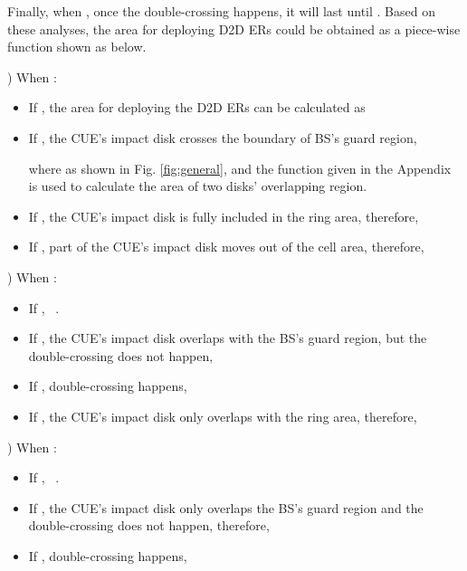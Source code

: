 \documentclass[journal, 10pt]{IEEEtran}
\begin{document}
Finally, when ,  once the double-crossing happens, it 
will last until . Based on these analyses, the 
area for deploying D2D ERs could be obtained as a piece-wise function 
 shown as below. 

) When  :
\begin{itemize}
\item If , the area for 
deploying the D2D ERs can be calculated as 

\item  If , 
the CUE's impact disk crosses the boundary of BS's guard region, 

where  as shown in Fig. 
\ref{fig:general}, and the function  given in the Appendix is 
used to calculate the area of two disks' overlapping region.
\item If , 
the CUE's impact disk is fully included in the ring area, therefore, 

\item  If , 
part of the CUE's impact disk moves out of the cell area, therefore,  
 
\end{itemize}

) When  :
\begin{itemize}
\item If ,  
~.
\item If , 
the CUE's impact disk overlaps with the BS's guard region, but the 
double-crossing does not happen, 
\setlength{\arraycolsep}{0.0em}

\setlength{\arraycolsep}{5pt}
\item If , double-crossing happens,
\setlength{\arraycolsep}{0.0em}

\setlength{\arraycolsep}{5pt}
\item  If , 
the CUE's impact disk only overlaps with the ring area, therefore,

\end{itemize}


) When  :
\begin{itemize}
\item If , 
~.
\item If , 
the CUE's impact disk only overlaps the BS's guard region and the double-crossing 
does not happen, therefore,  
\setlength{\arraycolsep}{0.0em}

\setlength{\arraycolsep}{5pt}
\item If , 
double-crossing happens,
\setlength{\arraycolsep}{0.0em}

\setlength{\arraycolsep}{5pt}
\end{itemize}
\end{document}
